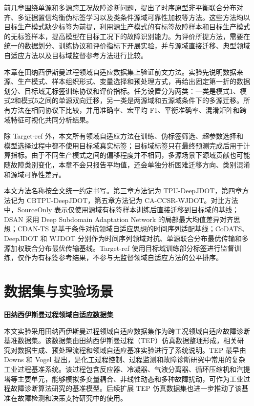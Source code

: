 \documentclass{seuthesis-2022}
\begin{document}
前几章围绕单源和多源跨工况故障诊断问题，提出了时序原型非平衡联合分布对齐、多证据置信均衡伪标签学习以及类条件源域可靠性加权等方法。这些方法均以目标生产模式缺少标签为前提，利用源生产模式的有标签故障样本和目标生产模式的无标签样本，提高模型在目标工况下的故障识别能力。为评价所提方法，需要在统一的数据划分、训练协议和评价指标下开展实验，并与源域直接迁移、典型领域自适应方法以及目标域监督参考方法进行比较。

本章在田纳西伊斯曼过程领域自适应数据集上验证前文方法。实验先说明数据来源、生产模式、样本组织形式、变量选择和预处理方式，再给出固定第一折的数据划分、目标域无标签训练协议和评价指标。任务设置分为两类：一类是模式1、模式2和模式5之间的单源双向迁移，另一类是两源域和五源域条件下的多源迁移。所有方法在相同协议下比较，并用准确率、宏平均 F1、平衡准确率、混淆矩阵和跨域特征可视化共同分析结果。

除 Target-ref 外，本文所有领域自适应方法在训练、伪标签筛选、超参数选择和模型选择过程中都不使用目标域真实标签；目标域标签只在最终预测完成后用于计算指标。由于不同生产模式之间的偏移程度并不相同，多源场景下源域贡献也可能随故障类别变化，本章不会只报告平均值，还会单独分析困难迁移方向、类别混淆和源域可靠性差异。

本文方法名称按全文统一约定书写。第三章方法记为 TPU-DeepJDOT，第四章方法记为 CBTPU-DeepJDOT，第五章方法记为 CA-CCSR-WJDOT。对比方法中，SourceOnly 表示仅使用源域有标签样本训练后直接迁移到目标域的基线；DSAN 采用 Deep Subdomain Adaptation Network 的局部最大均值差异对齐思想\cite{zhu2021dsan}；CDAN-TS 是基于条件对抗领域自适应思想的时间序列适配基线\cite{long2018conditional}；CoDATS、DeepJDOT 和 WJDOT 分别作为时间序列领域对抗、单源联合分布最优传输和多源加权联合分布最优传输基线\cite{wilson2020codats,damodaran2018deepjdot,turrisi2022wjdot}。Target-ref 使用目标域训练部分标签进行监督训练，仅作为有标签参考结果，不参与无监督领域自适应方法的公平排序。

\section{数据集与实验场景}

\noindent\textbf{田纳西伊斯曼过程领域自适应数据集}

本文实验采用田纳西伊斯曼过程领域自适应数据集作为跨工况领域自适应故障诊断基准数据集。该数据集由田纳西伊斯曼过程（TEP）仿真数据整理形成，相关研究对数据生成、预处理流程和领域自适应基准实验进行了系统说明\cite{montesuma2024benchmark}。TEP 最早由 Downs 和 Vogel 提出，是化工过程控制、过程监测和故障诊断研究中常用的复杂工业过程基准系统\cite{downs1993plant}。该过程包含反应器、冷凝器、气液分离器、循环压缩机和汽提塔等主要单元，能够模拟多变量耦合、非线性动态和多种故障扰动，可作为工业过程故障诊断算法研究的基准模型。后续扩展 TEP 仿真数据集也进一步推动了该基准在故障检测和决策支持研究中的使用\cite{reinartz2021extended}。
\end{document}
